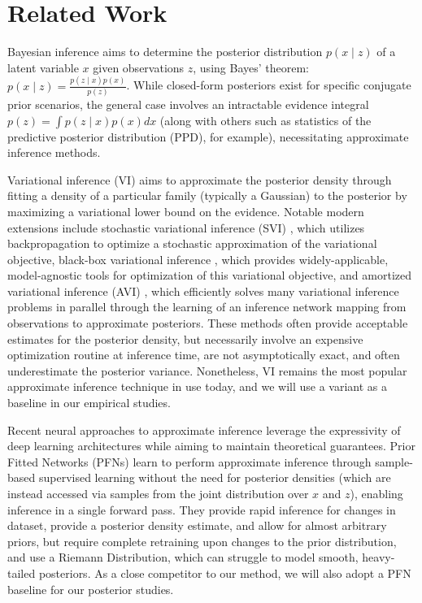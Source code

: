 \section{Related Work}
Bayesian inference aims to determine the posterior distribution $p(x \mathop{|} z)$ of a latent variable $x$ given observations $z$, using Bayes' theorem: $p(x \mathop{|} z)=\frac{p(z \mathop{|} x)p(x)}{p(z)}$. While closed-form posteriors exist for specific conjugate prior scenarios, the general case involves an intractable evidence integral $p(z) = \int p(z \mathop{|} x)p(x)dx$ (along with others such as statistics of the predictive posterior distribution (PPD), for example), necessitating approximate inference methods.

Variational inference (VI) aims to approximate the posterior density through fitting a density of a particular family (typically a Gaussian) to the posterior by maximizing a variational lower bound on the evidence. Notable modern extensions include stochastic variational inference (SVI) \cite{svi}, which utilizes backpropagation to optimize a stochastic approximation of the variational objective, black-box variational inference \cite{black_box_vi}, which provides widely-applicable, model-agnostic tools for optimization of this variational objective, and amortized variational inference (AVI) \cite{vae, amortized_vi_review}, which efficiently solves many variational inference problems in parallel through the learning of an inference network mapping from observations to approximate posteriors.  These methods often provide acceptable estimates for the posterior density, but necessarily involve an expensive optimization routine at inference time, are not asymptotically exact, and often underestimate the posterior variance. Nonetheless, VI remains the most popular approximate inference technique in use today, and we will use a variant as a baseline in our empirical studies.

Recent neural approaches to approximate inference leverage the expressivity of deep learning architectures while aiming to maintain theoretical guarantees. Prior Fitted Networks (PFNs) \cite{pfns} learn to perform approximate inference through sample-based supervised learning without the need for posterior densities (which are instead accessed via samples from the joint distribution over $x$ and $z$), enabling inference in a single forward pass. They provide rapid inference for changes in dataset, provide a posterior density estimate, and allow for almost arbitrary priors, but require complete retraining upon changes to the prior distribution, and use a Riemann Distribution, which can struggle to model smooth, heavy-tailed posteriors. As a close competitor to our method, we will also adopt a PFN baseline for our posterior studies. 

